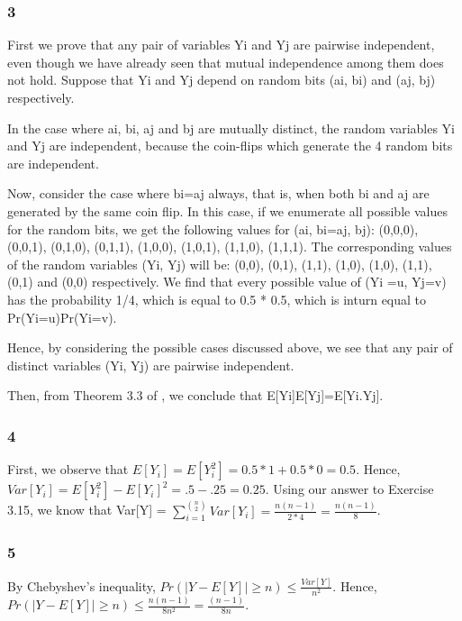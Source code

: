 \documentclass[10pt]{article}
\begin{document}
\subsubsection*{3} First we prove that any pair of variables Yi and Yj are pairwise independent, even though we have already seen that mutual independence among them does not hold. Suppose that Yi and Yj depend on random bits (ai, bi) and (aj, bj) respectively.

In the case where ai, bi, aj and bj are mutually distinct, the random variables Yi and Yj are independent, because the coin-flips which generate the 4 random bits are independent.

Now, consider the case where bi=aj always, that is, when both bi and aj are generated by the same coin flip. In this case, if we enumerate all possible values for the random bits, we get the following values for (ai, bi=aj, bj): (0,0,0), (0,0,1), (0,1,0), (0,1,1), (1,0,0), (1,0,1), (1,1,0), (1,1,1). The corresponding values of the random variables (Yi, Yj) will be: (0,0), (0,1), (1,1), (1,0), (1,0), (1,1), (0,1) and (0,0) respectively. We find that every possible value of (Yi =u, Yj=v) has the probability 1/4, which is equal to 0.5 * 0.5, which is inturn equal to Pr(Yi=u)Pr(Yi=v).

Hence, by considering the possible cases discussed above, we see that any pair of distinct variables (Yi, Yj) are pairwise independent.

Then, from Theorem 3.3 of \cite{mitzenmacherUpfal}, we conclude that E[Yi]E[Yj]=E[Yi.Yj].

\subsubsection*{4} First, we observe that $E[Y_{i}]=E[Y_{i}^{2}]=0.5*1+0.5*0=0.5$. Hence, $Var[Y_{i}]=E[Y_{i}^{2}]-E[Y_{i}]^{2}=.5-.25=0.25$. Using our answer to Exercise 3.15, we know that Var[Y] = $\sum_{i=1}^{\binom{n}{2}} Var[Y_{i}]=\frac{n(n-1)}{2*4}=\frac{n(n-1)}{8}$.

\subsubsection*{5} By Chebyshev's inequality, $Pr(|Y-E[Y]|\geq n) \leq \frac{Var[Y]}{n^{2}}$. Hence, $Pr(|Y-E[Y]|\geq n) \leq \frac{n(n-1)}{8n^{2}}=\frac{(n-1)}{8n}$.



\end{document}
